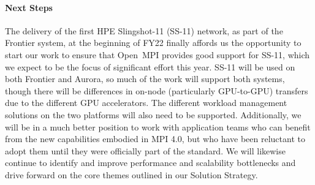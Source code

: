 \paragraph{Next Steps}
The delivery of the first HPE Slingshot-11 (SS-11) network, as part of the Frontier system, at the beginning of FY22 finally affords us
the opportunity to start our work to ensure that Open~MPI provides good support for SS-11, which we expect to be the focus of significant
effort this year.  SS-11 will be used on both Frontier and Aurora, so much of the work will support both systems, though there will be differences 
in on-node (particularly GPU-to-GPU) transfers due to the different GPU accelerators.  The different workload management solutions on the two platforms
will also need to be supported.  Additionally, we will be in a much better position to work with application teams who can benefit from the new capabilities 
embodied in MPI 4.0, but who have been reluctant to adopt them until they were officially part of the standard.  
We will likewise continue to identify and improve performance and scalability bottlenecks and drive forward on
the core themes outlined in our Solution Strategy.
